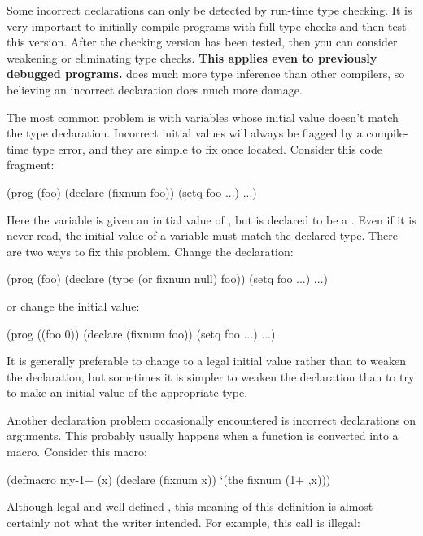 Some incorrect declarations can only be detected by run-time type
checking.  It is very important to initially compile programs with
full type checks and then test this version.  After the checking
version has been tested, then you can consider weakening or
eliminating type checks.  {\bf This applies even to previously debugged
  programs.}  \python{} does much more type inference than other
\llisp{} compilers, so believing an incorrect declaration does much
more damage.

The most common problem is with variables whose initial value doesn't
match the type declaration.  Incorrect initial values will always be
flagged by a compile-time type error, and they are simple to fix once
located.  Consider this code fragment:

\begin{example}
(prog (foo)
  (declare (fixnum foo))
  (setq foo ...)
  ...)
\end{example}

Here the variable  is given an initial value of \false, but
is declared to be a .  Even if it is never read, the
initial value of a variable must match the declared type.  There are
two ways to fix this problem.  Change the declaration:

\begin{example}
(prog (foo)
  (declare (type (or fixnum null) foo))
  (setq foo ...)
  ...)
\end{example}

or change the initial value:

\begin{example}
(prog ((foo 0))
  (declare (fixnum foo))
  (setq foo ...)
  ...)
\end{example}

It is generally preferable to change to a legal initial value rather
than to weaken the declaration, but sometimes it is simpler to weaken
the declaration than to try to make an initial value of the
appropriate type.

Another declaration problem occasionally encountered is incorrect
declarations on  arguments.  This probably usually
happens when a function is converted into a macro.  Consider this
macro:

\begin{lisp}
(defmacro my-1+ (x)
  (declare (fixnum x))
  `(the fixnum (1+ ,x)))
\end{lisp}

Although legal and well-defined \clisp, this meaning of this
definition is almost certainly not what the writer intended.  For
example, this call is illegal:

